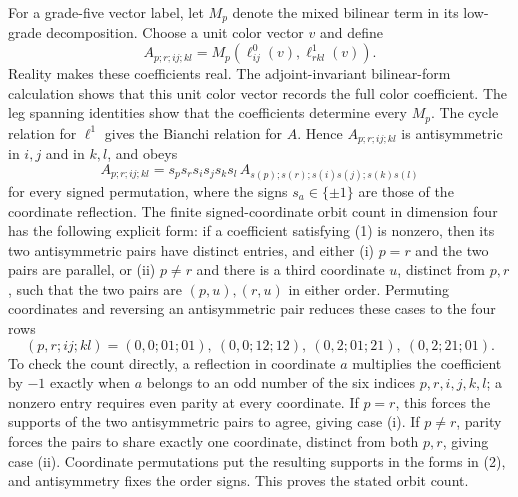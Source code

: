 For a grade-five vector label, let $M_p$ denote the mixed bilinear term
in its low-grade decomposition. Choose a unit color vector $v$ and define
\[
 A_{p;r;ij;kl}=M_p(\ell^0_{ij}(v),\ell^1_{rkl}(v)).
\]
Reality makes these coefficients real. The adjoint-invariant bilinear-form
calculation shows that this unit color vector records the full color
coefficient. The leg spanning identities show that the coefficients
determine every $M_p$. The cycle relation for $\ell^1$ gives the Bianchi
relation for $A$. Hence $A_{p;r;ij;kl}$ is antisymmetric in $i,j$ and in
$k,l$, and obeys
\begin{equation}
 A_{p;r;ij;kl}
 =s_p s_r s_i s_j s_k s_l\,
 A_{s(p);s(r);s(i)s(j);s(k)s(l)}
\label{eq:ex-trace-signed-array}
\end{equation}
for every signed permutation, where the signs $s_a\in\{\pm1\}$ are those
of the coordinate reflection. The finite signed-coordinate orbit count in
dimension four has the following explicit form: if a coefficient satisfying
(1) is nonzero, then its two antisymmetric pairs have distinct entries, and
either (i) $p=r$ and the two pairs are parallel, or (ii) $p\ne r$ and there
is a third coordinate $u$, distinct from $p,r$, such that the two pairs are
$(p,u),(r,u)$ in either order. Permuting coordinates and reversing an
antisymmetric pair reduces these cases to the four rows
\begin{equation}
 (p,r;ij;kl)=(0,0;01;01),\ (0,0;12;12),\
 (0,2;01;21),\ (0,2;21;01).
\label{eq:ex-trace-orbit-representatives}
\end{equation}
To check the count directly, a reflection in coordinate $a$ multiplies the
coefficient by $-1$ exactly when $a$ belongs to an odd number of the six
indices $p,r,i,j,k,l$; a nonzero entry requires even parity at every
coordinate. If $p=r$, this forces the supports of the two antisymmetric
pairs to agree, giving case (i). If $p\ne r$, parity forces the pairs to
share exactly one coordinate, distinct from both $p,r$, giving case (ii).
Coordinate permutations put the resulting supports in the forms in (2),
and antisymmetry fixes the order signs. This proves the stated orbit count.

